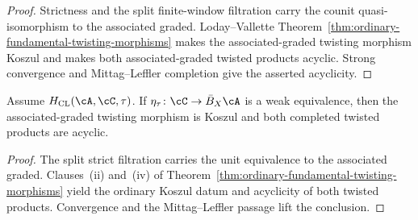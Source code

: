 \begin{proof}
Strictness and the split finite-window filtration carry the counit
quasi-isomorphism to the associated graded.  Loday--Vallette
Theorem~\ref{thm:ordinary-fundamental-twisting-morphisms} makes the
associated-graded twisting morphism Koszul and makes both
associated-graded twisted products acyclic.  Strong convergence and
Mittag--Leffler completion give the asserted acyclicity.
\end{proof}

\begin{lemma}
\label{lem:filtered-comparison-unit}
Assume \(H_{\mathrm{CL}}(\cA,\cC,\tau)\).  If
\(\eta_\tau\colon\cC\to\bar B_X\cA\) is a weak equivalence, then the
associated-graded twisting morphism is Koszul and both completed
twisted products are acyclic.
\end{lemma}

\begin{proof}
The split strict filtration carries the unit equivalence to the
associated graded.  Clauses~\textup{(ii)} and~\textup{(iv)} of
Theorem~\ref{thm:ordinary-fundamental-twisting-morphisms} yield the
ordinary Koszul datum and acyclicity of both twisted products.
Convergence and the Mittag--Leffler passage lift the conclusion.
\end{proof}

